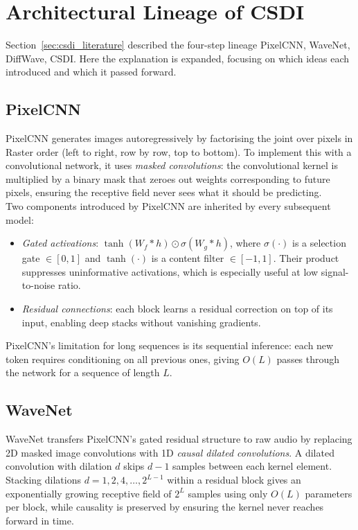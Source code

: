 \chapter{Architectural Lineage of CSDI}
\label{app:arch_lineage}

Section~\ref{sec:csdi_literature} described the four-step lineage PixelCNN, WaveNet, DiffWave, CSDI. Here the explanation is expanded, focusing on which ideas each introduced and which it
passed forward.

\section{PixelCNN}

PixelCNN \cite{oord2016pixel} generates images autoregressively by factorising
the joint over pixels in Raster order (left to right, row by row, top to bottom). To implement this with a convolutional
network, it uses \textit{masked convolutions}: the convolutional kernel is
multiplied by a binary mask that zeroes out weights corresponding to future
pixels, ensuring the receptive field never sees what it should be predicting.\\

Two components introduced by PixelCNN are inherited by every subsequent model:
\begin{itemize}
    \item \textit{Gated activations}: $\tanh(W_f * h) \odot \sigma(W_g * h)$,
    where $\sigma(\cdot)$ is a selection gate $\in [0,1]$ and $\tanh(\cdot)$
    is a content filter $\in [-1,1]$. Their product suppresses uninformative
    activations, which is especially useful at low signal-to-noise ratio.
    \item \textit{Residual connections}: each block learns a residual correction
    on top of its input, enabling deep stacks without vanishing gradients.
\end{itemize}
PixelCNN's limitation for long sequences is its sequential inference: each new
token requires conditioning on all previous ones, giving $O(L)$ passes through
the network for a sequence of length $L$.

\section{WaveNet}

WaveNet \cite{oord2016wavenet} transfers PixelCNN's gated residual structure
to raw audio by replacing 2D masked image convolutions with 1D
\textit{causal dilated convolutions}. A dilated convolution with dilation $d$
skips $d-1$ samples between each kernel element. Stacking dilations
$d = 1, 2, 4, \ldots, 2^{L-1}$ within a residual block gives an exponentially
growing receptive field of $2^L$ samples using only $O(L)$ parameters per
block, while causality is preserved by ensuring the kernel never reaches
forward in time.

